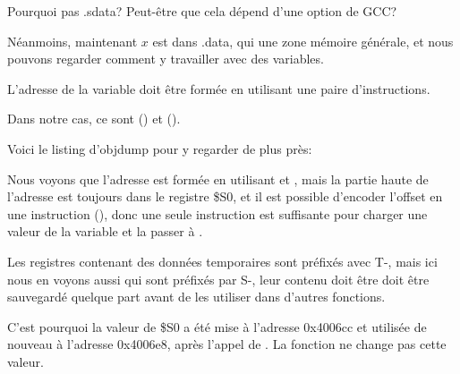

Pourquoi pas .sdata? Peut-être que cela dépend d'une option de GCC?

Néanmoins, maintenant $x$ est dans .data, qui une zone mémoire générale, et nous
pouvons regarder comment y travailler avec des variables.


L'adresse de la variable doit être formée en utilisant une paire d'instructions.

Dans notre cas, ce sont  () et  ().

Voici le listing d'objdump pour y regarder de plus près:




Nous voyons que l'adresse est formée en utilisant  et , mais
la partie haute de l'adresse est toujours dans le registre \$S0, et il est possible
d'encoder l'offset en une instruction  (), donc une seule instruction
 est suffisante pour charger une valeur de la variable et la passer à \printf.

Les registres contenant des données temporaires sont préfixés avec T-, mais ici
nous en voyons aussi qui sont préfixés par S-, leur contenu doit être doit être
sauvegardé quelque part avant de les utiliser dans d'autres fonctions.

C'est pourquoi la valeur de \$S0 a été mise à l'adresse 0x4006cc et utilisée
de nouveau à l'adresse 0x4006e8, après l'appel de \scanf.
La fonction \scanf ne change pas cette valeur.

